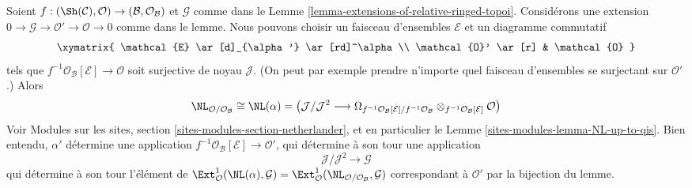 \begin{remark}
\label{remark-extensions-of-relative-ringed-topoi}
Soient $f : (\Sh(\mathcal{C}), \mathcal{O}) \to
(\mathcal{B}, \mathcal{O}_\mathcal{B})$ et $\mathcal{G}$ comme dans le
Lemme \ref{lemma-extensions-of-relative-ringed-topoi}.
Considérons une extension
$0 \to \mathcal{G} \to \mathcal{O}' \to \mathcal{O} \to 0$ comme dans le
lemme. Nous pouvons choisir un faisceau d'ensembles $\mathcal{E}$ et un
diagramme commutatif
$$
\xymatrix{
\mathcal{E} \ar[d]_{\alpha'} \ar[rd]^\alpha \\
\mathcal{O}' \ar[r] & \mathcal{O}
}
$$
tels que $f^{-1}\mathcal{O}_\mathcal{B}[\mathcal{E}] \to \mathcal{O}$ soit
surjective de noyau $\mathcal{J}$.
(On peut par exemple prendre n'importe quel faisceau d'ensembles se surjectant
sur $\mathcal{O}'$.) Alors
$$
\NL_{\mathcal{O}/\mathcal{O}_\mathcal{B}} \cong \NL(\alpha) = 
\left(
\mathcal{J}/\mathcal{J}^2
\longrightarrow
\Omega_{f^{-1}\mathcal{O}_\mathcal{B}[\mathcal{E}]/
f^{-1}\mathcal{O}_\mathcal{B}}
\otimes_{f^{-1}\mathcal{O}_\mathcal{B}[\mathcal{E}]} \mathcal{O}\right)
$$
Voir Modules sur les sites,
section \ref{sites-modules-section-netherlander}, et en particulier le
Lemme \ref{sites-modules-lemma-NL-up-to-qis}.
Bien entendu, $\alpha'$ détermine une application
$f^{-1}\mathcal{O}_\mathcal{B}[\mathcal{E}] \to \mathcal{O}'$, qui détermine
à son tour une application
$$
\mathcal{J}/\mathcal{J}^2 \longrightarrow \mathcal{G}
$$
qui détermine à son tour l'élément de
$\Ext^1_\mathcal{O}(\NL(\alpha), \mathcal{G}) =
\Ext^1_\mathcal{O}(\NL_{\mathcal{O}/\mathcal{O}_\mathcal{B}}, \mathcal{G})$
correspondant à $\mathcal{O}'$ par la bijection du lemme.
\end{remark}

